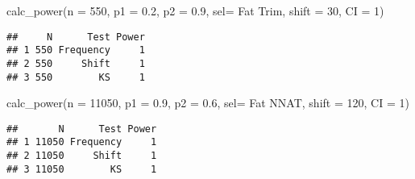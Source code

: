 \documentclass[
]{article}
\newenvironment{Shaded}{\begin{snugshade}}{\end{snugshade}}
\newcommand{\AttributeTok}[1]{\textcolor[rgb]{0.77,0.63,0.00}{#1}}
\newcommand{\DecValTok}[1]{\textcolor[rgb]{0.00,0.00,0.81}{#1}}
\newcommand{\FloatTok}[1]{\textcolor[rgb]{0.00,0.00,0.81}{#1}}
\newcommand{\FunctionTok}[1]{\textcolor[rgb]{0.00,0.00,0.00}{#1}}
\newcommand{\NormalTok}[1]{#1}
\newcommand{\StringTok}[1]{\textcolor[rgb]{0.31,0.60,0.02}{#1}}
\begin{document}
\begin{Shaded}
\begin{Highlighting}[]
\FunctionTok{calc\_power}\NormalTok{(}\AttributeTok{n =} \DecValTok{550}\NormalTok{, }\AttributeTok{p1 =} \FloatTok{0.2}\NormalTok{, }\AttributeTok{p2 =} \FloatTok{0.9}\NormalTok{, }\AttributeTok{sel=} \StringTok{\textquotesingle{}Fat Trim\textquotesingle{}}\NormalTok{, }\AttributeTok{shift =} \DecValTok{30}\NormalTok{, }\AttributeTok{CI =} \DecValTok{1}\NormalTok{)}
\end{Highlighting}
\end{Shaded}

\begin{verbatim}
##     N      Test Power
## 1 550 Frequency     1
## 2 550     Shift     1
## 3 550        KS     1
\end{verbatim}

\begin{Shaded}
\begin{Highlighting}[]
\FunctionTok{calc\_power}\NormalTok{(}\AttributeTok{n =} \DecValTok{11050}\NormalTok{, }\AttributeTok{p1 =} \FloatTok{0.9}\NormalTok{, }\AttributeTok{p2 =} \FloatTok{0.6}\NormalTok{, }\AttributeTok{sel=} \StringTok{\textquotesingle{}Fat NNAT\textquotesingle{}}\NormalTok{, }\AttributeTok{shift =} \DecValTok{120}\NormalTok{, }\AttributeTok{CI =} \DecValTok{1}\NormalTok{)}
\end{Highlighting}
\end{Shaded}

\begin{verbatim}
##       N      Test Power
## 1 11050 Frequency     1
## 2 11050     Shift     1
## 3 11050        KS     1
\end{verbatim}
\end{document}
